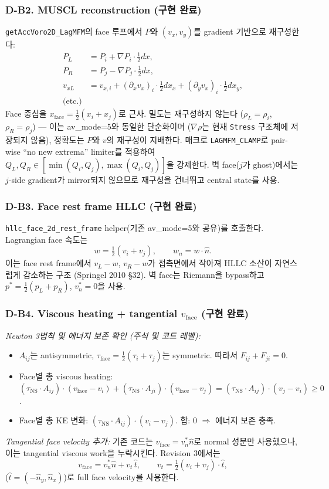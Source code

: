 \documentclass[11pt]{article}
\begin{document}
\subsubsection*{D-B2. MUSCL reconstruction (구현 완료)}
\texttt{getAccVoro2D\_LagMFM}의 face 루프에서 $P$와 $(v_x, v_y)$를
gradient 기반으로 재구성한다:
\begin{align*}
 P_L &= P_i + \nabla P_i\cdot \tfrac12 dx, \\
 P_R &= P_j - \nabla P_j\cdot \tfrac12 dx, \\
 v_{xL} &= v_{x,i} + (\partial_x v_x)_i\cdot\tfrac12 dx_x + (\partial_y v_x)_i\cdot\tfrac12 dx_y, \\
 \text{(etc.)}
\end{align*}
Face 중심을 $x_\mathrm{face} = \tfrac12(x_i + x_j)$로 근사. 밀도는 재구성하지 않는다
($\rho_L = \rho_i$, $\rho_R = \rho_j$) --- 이는 av\_mode=5와 동일한 단순화이며
($\nabla\rho$는 현재 \texttt{Stress} 구조체에 저장되지 않음), 정확도는 $P$와 $v$의
재구성이 지배한다. 매크로 \texttt{LAGMFM\_CLAMP}로 pair-wise ``no new extrema''
limiter를 적용하여 $Q_L, Q_R \in [\min(Q_i,Q_j), \max(Q_i,Q_j)]$을 강제한다.
벽 face($j$가 ghost)에서는 $j$-side gradient가 mirror되지 않으므로
재구성을 건너뛰고 central state를 사용.

\subsubsection*{D-B3. Face rest frame HLLC (구현 완료)}
\texttt{hllc\_face\_2d\_rest\_frame} helper(기존 av\_mode=5와 공유)를 호출한다.
Lagrangian face 속도는
\[
 w = \tfrac12(v_i + v_j),\qquad w_n = w\cdot \hat n.
\]
이는 face rest frame에서 $v_L - w$, $v_R - w$가 접촉면에서 작아져 HLLC
소산이 자연스럽게 감소하는 구조 (Springel 2010 §32). 벽 face는 Riemann을
bypass하고 $p^* = \tfrac12(p_L + p_R)$, $v_n^* = 0$을 사용.

\subsubsection*{D-B4. Viscous heating + tangential $v_\mathrm{face}$ (구현 완료)}
\emph{Newton 3법칙 및 에너지 보존 확인 (주석 및 코드 레벨):}
\begin{itemize}
 \item $A_{ij}$는 antisymmetric, $\tau_\mathrm{face}=\tfrac12(\tau_i+\tau_j)$는 symmetric.
       따라서 $F_{ij} + F_{ji} = 0$.
 \item Face별 총 viscous heating:
       $(\tau_\mathrm{NS}\cdot A_{ij})\cdot(v_\mathrm{face} - v_i)
         + (\tau_\mathrm{NS}\cdot A_{ji})\cdot(v_\mathrm{face} - v_j)
         = (\tau_\mathrm{NS}\cdot A_{ij})\cdot(v_j - v_i) \ge 0$.
 \item Face별 총 KE 변화: $(\tau_\mathrm{NS}\cdot A_{ij})\cdot(v_i - v_j)$.
       합: $0$ $\Rightarrow$ 에너지 보존 충족.
\end{itemize}
\emph{Tangential face velocity 추가:}
기존 코드는 $v_\mathrm{face} = v_n^*\hat n$로 normal 성분만 사용했으나,
이는 tangential viscous work을 누락시킨다. Revision 3에서는
\[
 v_\mathrm{face} = v_n^* \hat n + v_t\,\hat t,\qquad
 v_t = \tfrac12 (v_i + v_j)\cdot\hat t,
\]
($\hat t = (-\hat n_y, \hat n_x)$)로 full face velocity를 사용한다.
\end{document}
